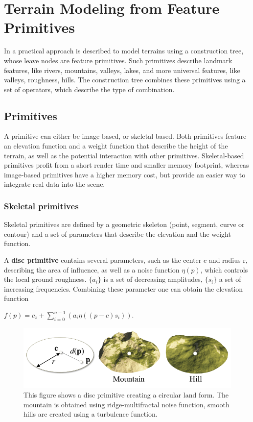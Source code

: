 \section{Terrain Modeling from Feature Primitives}
\label{sec:tmffp}
In \cite{CGF:CGF12530} a practical approach is described to model terrains using a construction tree, whose leave nodes are feature primitives. Such primitives describe landmark features, like rivers, mountains, valleys, lakes, and more universal features, like valleys, roughness, hills. The construction tree combines these primitives using a set of operators, which describe the type of combination. 

\subsection{Primitives}
A primitive can either be image based, or skeletal-based. Both primitives feature an elevation function and a weight function that describe the height of the terrain, as well as the potential interaction with other primitives. Skeletal-based primitives profit from a short render time and smaller memory footprint, whereas image-based primitives have a higher memory cost, but provide an easier way to integrate real data into the scene. 

\subsubsection{Skeletal primitives}
Skeletal primitives are defined by a geometric skeleton (point, segment, curve or contour) and a set of parameters that describe the elevation and the weight function. 

A \textbf{disc primitive} contains several parameters, such as the center c and radius r, describing the area of influence, as well as a noise function $\eta(p) $, which controls the local ground roughness. $\{a_i\}$ is a set of decreasing amplitudes, $\{s_i\}$ a set of increasing frequencies. Combining these parameter one can obtain the elevation function
\begin{center}
$ f(p) = c_{z} +  \sum\limits_{i = 0}^{n-1}(a_i\eta((p-c)s_i))$. 
\end{center}

\begin{figure}[htb]
	\centering
	\includegraphics[width=.8\linewidth]{GGP15/disc_primitive}
	\caption{This figure shows a disc primitive creating a circular land form. The mountain is obtained using ridge-multifractal noise function, smooth hills are created using a turbulence function.}
	\label{fig:disc_primitive}
\end{figure}

